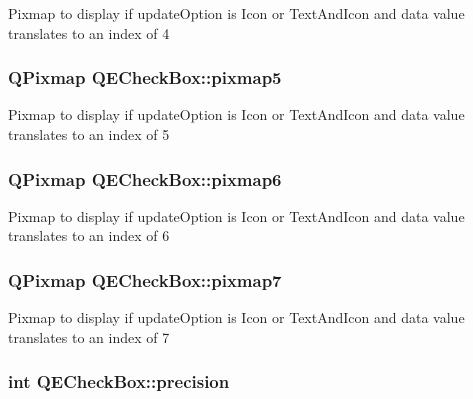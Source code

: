 \label{classQECheckBox_aa08f0755f6cedb8e5853bae3a38c9ae4}
Pixmap to display if updateOption is Icon or TextAndIcon and data value translates to an index of 4 \hypertarget{classQECheckBox_ad7a88b536bf1061195f86fcffe5820e6}{
\subsubsection[{pixmap5}]{\setlength{\rightskip}{0pt plus 5cm}QPixmap QECheckBox::pixmap5}}
\label{classQECheckBox_ad7a88b536bf1061195f86fcffe5820e6}
Pixmap to display if updateOption is Icon or TextAndIcon and data value translates to an index of 5 \hypertarget{classQECheckBox_ac63a673d8295748727636181e72bf10b}{
\subsubsection[{pixmap6}]{\setlength{\rightskip}{0pt plus 5cm}QPixmap QECheckBox::pixmap6}}
\label{classQECheckBox_ac63a673d8295748727636181e72bf10b}
Pixmap to display if updateOption is Icon or TextAndIcon and data value translates to an index of 6 \hypertarget{classQECheckBox_a191f0d0d6c409c8e0a30cd54f311e978}{
\subsubsection[{pixmap7}]{\setlength{\rightskip}{0pt plus 5cm}QPixmap QECheckBox::pixmap7}}
\label{classQECheckBox_a191f0d0d6c409c8e0a30cd54f311e978}
Pixmap to display if updateOption is Icon or TextAndIcon and data value translates to an index of 7 \hypertarget{classQECheckBox_a24743b70dcbdbe44c90124d366b15821}{
\subsubsection[{precision}]{\setlength{\rightskip}{0pt plus 5cm}int QECheckBox::precision}}
